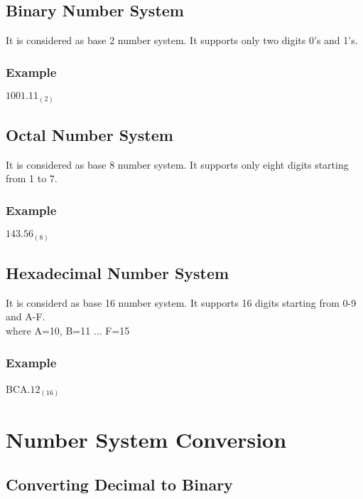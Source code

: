 \documentclass{article}
\begin{document}
	\subsection{Binary Number System}
	It is considered as base 2 number system. It supports only two digits 0's and 1's.
	
	\subsubsection{Example}
	$ 1001.11_{(2)} $
	
	\subsection{Octal Number System}
	It is considered as base 8 number system. It supports only eight digits starting from 1 to 7.
	
	\subsubsection{Example}
	$ 143.56_{(8)} $
	
	\subsection{Hexadecimal Number System}
	It is considerd as base 16 number system. It supports 16 digits starting from 0-9 and A-F.
	\\
	where A=10, B=11 $ \dots $ F=15
	\subsubsection{Example}
	BCA$ .12_{(16)} $
	
	\newpage
	
	\section{Number System Conversion}
	\subsection{Converting Decimal to Binary}
\end{document}
